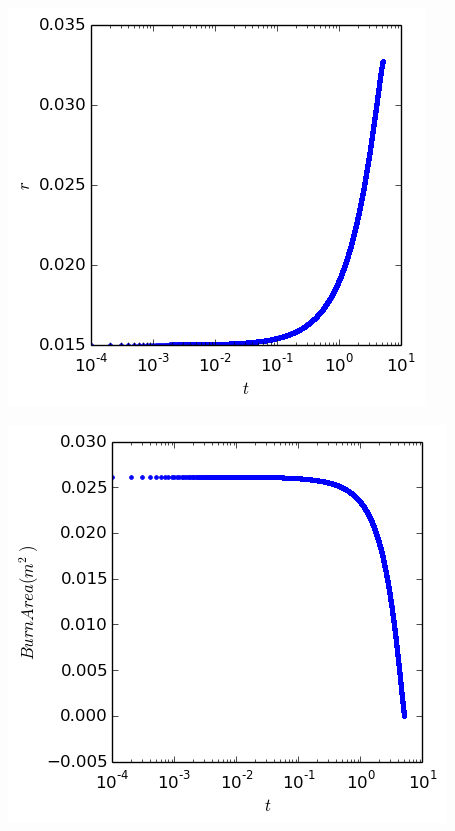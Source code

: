\documentclass[cleanfoot,cleanhead,twocolumn,10pt,notitlepage]{asme2e}
\begin{document}
\includegraphics[width=\linewidth]{../python_stuff/Part2/r.png}

\includegraphics[width=\linewidth]{../python_stuff/Part2/BurnArea.png}
\end{document}
